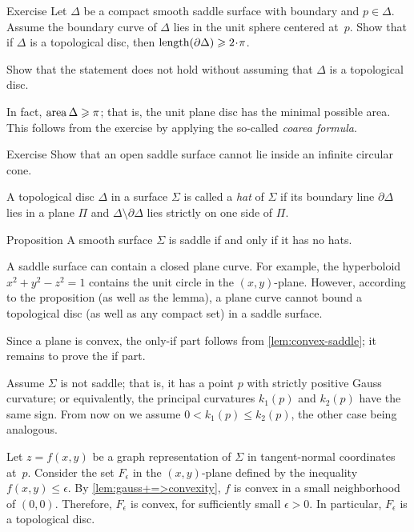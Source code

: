 \begin{thm}{Exercise}\label{ex:length-of-bry}
Let $\Delta$ be a compact smooth saddle surface with boundary and $p\in \Delta$.
Assume the boundary curve of $\Delta$ lies in the unit sphere centered at~$p$.
Show that if $\Delta$ is a topological disc, then $\length(\partial\Delta)\ge 2\cdot\pi$.

Show that the statement does not hold without assuming that $\Delta$ is a topological disc.
\end{thm}

In fact, $\mathop{\rm area}\nolimits \Delta\geqslant \pi$;
that is, the unit plane disc has the minimal possible area.
This follows from the exercise by applying the so-called \emph{coarea formula}.

\begin{thm}{Exercise}\label{ex:circular-cone-saddle}
Show that an open saddle surface
cannot lie inside an infinite circular cone.
\end{thm}

A topological disc $\Delta$ in a surface $\Sigma$ is called a \emph{hat} of $\Sigma$
if its boundary line $\partial\Delta$ lies in a plane $\Pi$ and $\Delta \setminus \partial \Delta$ lies strictly on one side of $\Pi$.

\begin{thm}{Proposition}\label{prop:hat}
A smooth surface $\Sigma$ is saddle if and only if it has no hats.
\end{thm}

A saddle surface can contain a closed plane curve.
For example, the hyperboloid $x^2+y^2-z^2=1$ contains the unit circle in the $(x,y)$-plane.
However, according to the proposition (as well as the lemma), a plane curve cannot bound a topological disc (as well as any compact set) in a saddle surface.

Since a plane is convex, the only-if part follows from \ref{lem:convex-saddle};
it remains to prove the if part.

Assume $\Sigma$ is not saddle; that is, it has a point $p$ with strictly positive Gauss curvature;
or equivalently, the principal curvatures $k_1(p)$ and $k_2(p)$ have the same sign.
From now on we assume $0 < k_1 (p) \leq k_2 (p) $, the other case being analogous.


Let $z=f(x,y)$ be a graph representation of $\Sigma$ in tangent-normal coordinates at~$p$.
Consider the set $F_\epsilon$ in the $(x,y)$-plane defined by the inequality $f(x,y)\le \epsilon$.
By \ref{lem:gauss+=>convexity}, $f$ is convex in a small neighborhood of $(0,0)$.
Therefore, $F_\epsilon$ is convex, for sufficiently small $\epsilon>0$.
In particular, $F_\epsilon$ is a topological disc.


